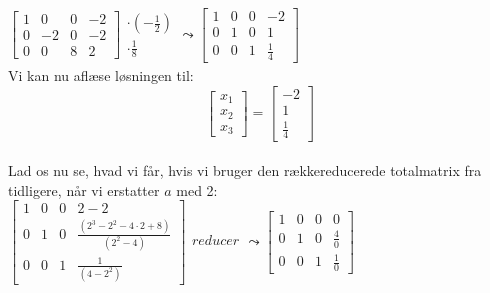 \documentclass[a4paper,12pt]{article}
\begin{document}
$
\left[\begin{array}{ccc|c}
    1 & 0 & 0 & -2 \\
    0 & -2 & 0 & -2 \\
    0 & 0 & 8 & 2
\end{array}\right]
\begin{array}{ccc}
    \\
    \cdot(-\frac{1}{2})\\
    \cdot \frac{1}{8}\\
\end{array}
\leadsto
\left[\begin{array}{ccc|c}
    1 & 0 & 0 & -2 \\
    0 & 1 & 0 & 1 \\
    0 & 0 & 1 & \frac{1}{4}
\end{array}\right]
$\\

Vi kan nu aflæse løsningen til:
\[
\left[\begin{array}{c}
    x_1\\
    x_2\\
    x_3
\end{array}\right]
=
\left[\begin{array}{c}
    -2\\
    1\\
    \frac{1}{4}
\end{array}\right]
\]\\

Lad os nu se, hvad vi får, hvis vi bruger den rækkereducerede totalmatrix fra tidligere, når vi erstatter $a$ med 2:\\

$
\left[\begin{array}{ccc|c}
    1 & 0 & 0 & 2-2 \\
    0 & 1 & 0 & \frac{(2^3 - 2^2 - 4\cdot 2 + 8)}{(2^2 - 4)} \\
    0 & 0 & 1 & \frac{1}{(4-2^2)}
\end{array}\right]
\begin{array}{ccc}
    \\
    reducer\\
    \\
\end{array}
\leadsto
\left[\begin{array}{ccc|c}
    1 & 0 & 0 & 0 \\
    0 & 1 & 0 & \frac{4}{0} \\
    0 & 0 & 1 & \frac{1}{0}
\end{array}\right]
$\\
\end{document}
